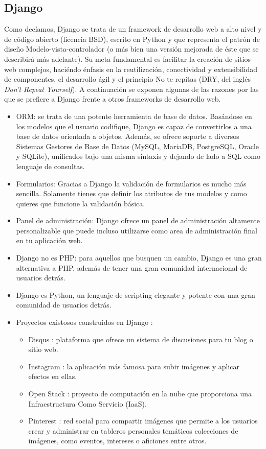 \subsection{Django} \cite{Dj}
Como decíamos, Django se trata de un framework de desarrollo web a alto nivel y de código abierto (licencia BSD), escrito en Python y que representa el patrón de diseño Modelo-vista-controlador (o más bien una versión mejorada de éste que se describirá más adelante). Su meta fundamental es facilitar la creación de sitios web complejos, haciéndo énfasis en la reutilización, conectividad y extensibilidad de componentes, el desarrollo ágil y el principio No te repitas (DRY, del inglés \textit{Don't Repeat Yourself}). A continuación se exponen algunas de las razones por las que se prefiere a Django frente a otros frameworks de desarrollo web.

\begin{itemize}
    \item ORM: se trata de una potente herramienta de base de datos. Basándose en los modelos que el usuario codifique, Django es capaz de convertirlos a una base de datos orientada a objetos. Además, se ofrece soporte a diversos Sistemas Gestores de Base de Datos (MySQL, MariaDB, PostgreSQL, Oracle y SQLite), unificados bajo una misma sintaxis y dejando de lado a SQL como lenguaje de consultas.
    \item Formularios: Gracias a Django la validación de formularios es mucho más sencilla. Solamente tienes que definir los atributos de tus modelos y como quieres que funcione la validación básica.
    \item Panel de administración: Django ofrece un panel de administración altamente personalizable que puede incluso utilizarse como area de administración final en tu aplicación web.
    \item Django no es PHP: para aquellos que busquen un cambio, Django es una gran alternativa a PHP, además de tener una gran comunidad internacional de usuarios detrás.
    \item Django es Python, un lenguaje de scripting elegante y potente con una gran comunidad de usuarios detrás.
    \item Proyectos existosos construidos en Django \cite{SUDj}: 
    \begin{itemize}
        \item Disqus \cite{Disqus}: plataforma que ofrece un sistema de discusiones para tu blog o sitio web.
        \item Instagram \cite{Instagram}: la aplicación más famosa para subir imágenes y aplicar efectos en ellas.
        \item Open Stack \cite{Open Stack}: proyecto de computación en la nube que proporciona una Infraestructura Como Servicio (IaaS).
        \item Pinterest \cite{Pinterest}: red social para compartir imágenes que permite a los usuarios crear y administrar en tableros personales temáticos colecciones de imágenes, como eventos, intereses o aficiones entre otros.
    \end{itemize}
\end{itemize}

